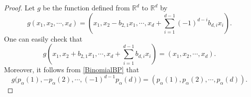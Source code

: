 \documentclass[twoside,12pt]{article}
\newcommand{\dR}{\mathbb{R}}
\begin{document}
\begin{proof}
Let $g$ be the function defined from $\dR^d$ to $\dR^d$ by 
\begin{equation}
g(x_{1}, x_{2}, \cdots, x_{d})
=\left(x_{1}, x_{2}-b_{2,1}x_{1}, \cdots, x_{d} + \sum_{i=1}^{d-1}(-1)^{d-i} b_{d,i}x_{i} 
\right).
\end{equation}
One can easily check that
\begin{equation*}
g\left(x_{1}, x_{2} + b_{2,1}x_{1}, \cdots, x_{d} + \sum_{i=1}^{d-1} b_{d,i}x_{i} \right)
=(x_{1}, x_{2},\cdots, x_{d}) 
.
\end{equation*}
Moreover, it follows from \eqref{BinomialBP} that
\begin{equation*}
g\Big(p_{\alpha}(1), -p_{\alpha}(2),
\cdots, (-1)^{d-1}p_{\alpha}(d)\Big)=
(p_{\alpha}(1), p_{\alpha}(2), \cdots, p_{\alpha}(d))
.
\end{equation*}

\end{proof}
\end{document}
